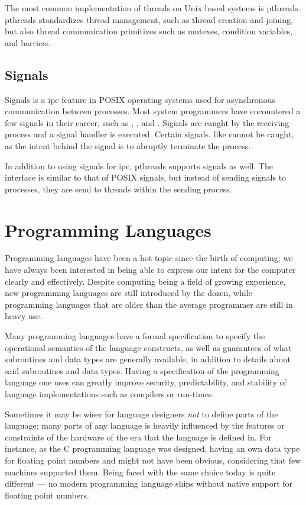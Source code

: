 The most common implementation of threads on Unix based systems is \gls{pthreads}. \gls{pthreads}
standardizes thread management, such as thread creation and joining, but also thread communication
primitives such as mutexes, condition variables, and barriers.


\subsection{Signals\label{sec:background-signals}}

Signals is a \gls{ipc} feature in POSIX operating systems used for asynchronous communication
between processes. Most system programmers have encountered a few signals in their career, such as
, ,  and . Signals are caught by the
receiving process and a signal handler is executed. Certain signals, like  cannot be
caught, as the intent behind the signal is to abruptly terminate the process.

In addition to using signals for \gls{ipc}, \gls{pthreads} supports signals as well. The interface
is similar to that of POSIX signals, but instead of sending signals to processes, they are send to
threads within the sending process.


\section{Programming Languages\label{sec:background-pl}}

Programming languages have been a hot topic since the birth of computing; we have always been
interested in being able to express our intent for the computer clearly and effectively. Despite
computing being a field of growing experience, new programming languages are still introduced by
the dozen, while programming languages that are older than the average programmer are still in
heavy use.

Many programming languages have a formal specification to specify the operational semantics of the
language constructs, as well as guarantees of what subroutines and data types are generally
available, in addition to details about said subroutines and data types. Having a specification of
the programming language one uses can greatly improve security, predictability, and stability of
language implementations such as compilers or run-times.

Sometimes it may be wiser for language designers \emph{not} to define parts of the language; many
parts of any language is heavily influenced by the features or constraints of the hardware of the
era that the language is defined in. For instance, as the C programming language was designed,
having an own data type for floating point numbers  and  might not have
been obvious, considering that few machines supported them. Being faced with the same choice today
is quite different --- no modern programming language ships without native support for floating
point numbers.

